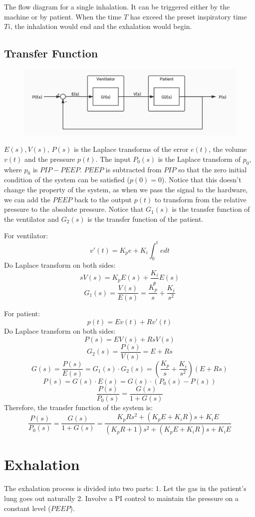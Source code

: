 \documentclass{article}
\begin{document}
The flow diagram for a single inhalation. It can be triggered either by the machine or by patient. When the time $T$ has exceed the preset inspiratory time $Ti$, the inhalation would end and the exhalation would begin.

\newpage

\subsection{Transfer Function}
\begin{figure}[h]
\centering
\includegraphics[scale=0.3]{block-diagram.jpg}
\end{figure}

$E(s), V(s)$, $P(s)$ is the Laplace transforms of the error $e(t)$, the volume $v(t)$ and the pressure $p(t)$. The input $P_{0}(s)$ is the Laplace transform of $p_{0}$, where $p_{0}$ is $PIP-PEEP$. $PEEP$ is subtracted from $PIP$ so that the zero initial condition of the system can be satisfied ($p(0)=0$). Notice that this doesn't change the property of the system, as when we pass the signal to the hardware, we can add the $PEEP$ back to the output $p(t)$ to transform from the relative pressure to the absolute pressure. Notice that  $G_1(s)$ is the transfer function of the ventilator and $G_2(s)$ is the transfer function of the patient.

For ventilator:
$$v'(t)=K_pe+K_i\int _0^tedt$$
Do Laplace transform on both sides:
$$sV(s)=K_pE(s)+\frac{K_i}{s}E(s)$$
$$G_1(s)=\frac{V(s)}{E(s)}=\frac{K_p}{s}+\frac{K_i}{s^2}$$

For patient:
$$p(t)=Ev(t)+Rv'(t)$$
Do Laplace transform on both sides:
$$P(s)=EV(s)+RsV(s)$$
$$G_2(s)=\frac{P(s)}{V(s)}=E+Rs$$
$$G(s)=\frac{P(s)}{E(s)}=G_1(s)\cdot G_2(s)=(\frac{K_p}{s}+\frac{K_i}{s^2})(E+Rs)$$
$$P(s)=G(s)\cdot E(s)=G(s)\cdot (P_0(s)-P(s))$$
$$\frac{P(s)}{P_0(s)}=\frac{G(s)}{1+G(s)}$$
Therefore, the transfer function of the system is:
$$\frac{P(s)}{P_0(s)}=\frac{G(s)}{1+G(s)}=\frac{K_pRs^2+(K_pE+K_iR)s+K_iE}{(K_pR+1)s^2+(K_pE+K_iR)s+K_iE}$$

\section{Exhalation}
The exhalation process is divided into two parts: 1. Let the gas in the patient's lung goes out naturally 2. Involve a PI control to maintain the pressure on a constant level ($PEEP$). 
\end{document}

